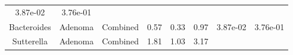 \documentclass[12pt,]{article}
\begin{document}
\begin{longtable}[]{@{}cccccccc@{}}
\begin{minipage}[t]{0.06\columnwidth}
3.87e-02\strut
\end{minipage} & \begin{minipage}[t]{0.06\columnwidth}\centering\strut
3.76e-01\strut
\end{minipage}\tabularnewline
\begin{minipage}[t]{0.19\columnwidth}\centering\strut
Bacteroides\strut
\end{minipage} & \begin{minipage}[t]{0.07\columnwidth}\centering\strut
Adenoma\strut
\end{minipage} & \begin{minipage}[t]{0.09\columnwidth}\centering\strut
Combined\strut
\end{minipage} & \begin{minipage}[t]{0.03\columnwidth}\centering\strut
0.57\strut
\end{minipage} & \begin{minipage}[t]{0.14\columnwidth}\centering\strut
0.33\strut
\end{minipage} & \begin{minipage}[t]{0.14\columnwidth}\centering\strut
0.97\strut
\end{minipage} & \begin{minipage}[t]{0.06\columnwidth}\centering\strut
3.87e-02\strut
\end{minipage} & \begin{minipage}[t]{0.06\columnwidth}\centering\strut
3.76e-01\strut
\end{minipage}\tabularnewline
\begin{minipage}[t]{0.19\columnwidth}\centering\strut
Sutterella\strut
\end{minipage} & \begin{minipage}[t]{0.07\columnwidth}\centering\strut
Adenoma\strut
\end{minipage} & \begin{minipage}[t]{0.09\columnwidth}\centering\strut
Combined\strut
\end{minipage} & \begin{minipage}[t]{0.03\columnwidth}\centering\strut
1.81\strut
\end{minipage} & \begin{minipage}[t]{0.14\columnwidth}\centering\strut
1.03\strut
\end{minipage} & \begin{minipage}[t]{0.14\columnwidth}\centering\strut
3.17\strut
\end{minipage} & \begin{minipage}[t]{0.06\columnwidth}\centering\strut

\end{minipage}
\end{longtable}
\end{document}

